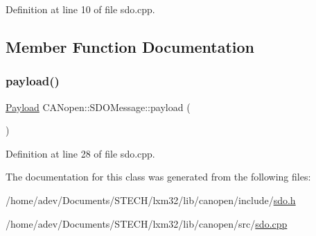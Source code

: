 Definition at line 10 of file sdo.\+cpp.



\subsection{Member Function Documentation}
\mbox{\label{class_c_a_nopen_1_1_s_d_o_message_a051509ddb3a59dfe066f9d90c80c2eec}} 
\subsubsection{\texorpdfstring{payload()}{payload()}}
{\footnotesize\ttfamily \hyperlink{class_c_a_nopen_1_1_payload}{Payload} C\+A\+Nopen\+::\+S\+D\+O\+Message\+::payload (\begin{DoxyParamCaption}{ }\end{DoxyParamCaption})}



Definition at line 28 of file sdo.\+cpp.



The documentation for this class was generated from the following files\+:\begin{DoxyCompactItemize}
\item 
/home/adev/\+Documents/\+S\+T\+E\+C\+H/lxm32/lib/canopen/include/\hyperlink{sdo_8h}{sdo.\+h}\item 
/home/adev/\+Documents/\+S\+T\+E\+C\+H/lxm32/lib/canopen/src/\hyperlink{sdo_8cpp}{sdo.\+cpp}\end{DoxyCompactItemize}

